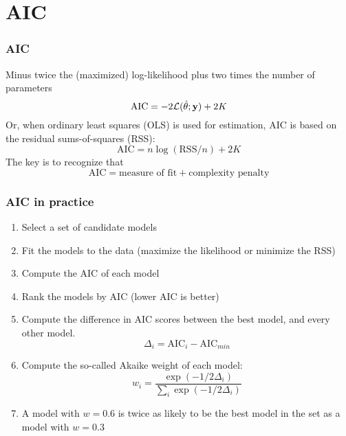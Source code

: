 \documentclass[color=usenames,dvipsnames]{beamer}\usepackage[]{graphicx}\usepackage[]{color}
\begin{document}
\section{AIC}





\begin{frame}[fragile]
  \frametitle{AIC}
  \large
  Minus twice the (maximized) log-likelihood plus two times the number of
  parameters
\[
 \mathrm{AIC} = -2\mathcal{L}(\hat{\theta} ; {\bf y}) + 2K
\]
  \pause
  Or, when ordinary least squares (OLS) is used for estimation, AIC is
  based on the residual sums-of-squares (RSS):
\[
 \mathrm{AIC} = n\log(\mathrm{RSS}/n) + 2K
\]
 \pause
 The key is to recognize that
\[
 \mathrm{AIC} = \text{measure of fit} + \text{complexity penalty}
\]
\end{frame}




\begin{frame}
  \frametitle{AIC in practice}
  \large
\begin{enumerate}[<+- | visible@+->][\bf \color{PineGreen} (1)]
  \item Select a set of candidate models
  \item Fit the models to the data (maximize the likelihood or
    minimize the RSS)
  \item Compute the AIC of each model
  \item Rank the models by AIC (lower AIC is better)
  \item Compute the difference in AIC scores between the
    best model, and every other model.
    \[
    \Delta_i = \text{AIC}_i - \text{AIC}_{min}
    \]
  \item Compute the so-called Akaike weight of each model:
    \[
    w_i = \frac{\exp(-1/2\Delta_i)}{\sum_i \exp(-1/2\Delta_i)}
    \]
  \item A model with $w=0.6$ is twice as likely to be the best model
    in the set as a model with $w=0.3$
\end{enumerate}
\end{frame}
\end{document}
